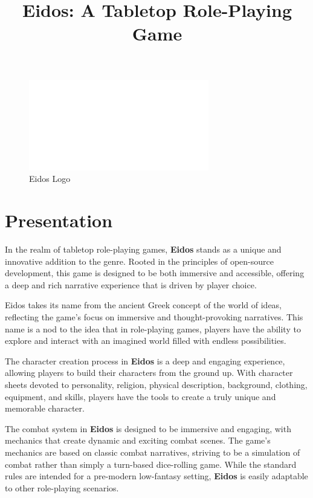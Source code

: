 \documentclass{article}
\title{Eidos: A Tabletop Role-Playing Game}
\author{}
\date{}
\begin{document}
\maketitle

\begin{figure}[h]
    \centering
    \includegraphics[width=0.7\textwidth]{./images/index01.svg}
    \caption{Eidos Logo}
\end{figure}

\section{Presentation}

In the realm of tabletop role-playing games, \textbf{Eidos} stands as a unique and innovative addition to the genre. Rooted in the principles of open-source development, this game is designed to be both immersive and accessible, offering a deep and rich narrative experience that is driven by player choice. 

Eidos takes its name from the ancient Greek concept of the world of ideas, reflecting the game's focus on immersive and thought-provoking narratives. This name is a nod to the idea that in role-playing games, players have the ability to explore and interact with an imagined world filled with endless possibilities.

The character creation process in \textbf{Eidos} is a deep and engaging experience, allowing players to build their characters from the ground up. With character sheets devoted to personality, religion, physical description, background, clothing, equipment, and skills, players have the tools to create a truly unique and memorable character.

The combat system in \textbf{Eidos} is designed to be immersive and engaging, with mechanics that create dynamic and exciting combat scenes. The game's mechanics are based on classic combat narratives, striving to be a simulation of combat rather than simply a turn-based dice-rolling game. While the standard rules are intended for a pre-modern low-fantasy setting, \textbf{Eidos} is easily adaptable to other role-playing scenarios.
\end{document}
